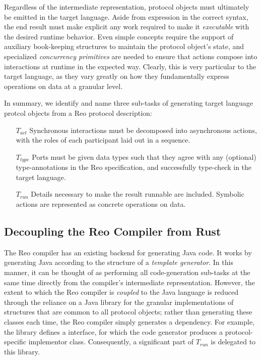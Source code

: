 Regardless of the intermediate representation, protocol objects must ultimately be emitted in the target language. Aside from expression in the correct syntax, the end result must make explicit any work required to make it \textit{executable} with the desired runtime behavior. Even simple concepts require the support of auxiliary book-keeping structures to maintain the protocol object's state, and specialized \textit{concurrency primitives} are needed to ensure that actions compose into interactions at runtime in the expected way. Clearly, this is very particular to the target language, as they vary greatly on how they fundamentally express operations on data at a granular level.

In summary, we identify and name three sub-tasks of generating target language protcol objects from a Reo protocol description:
\begin{itemize}
	\item [$T_{act}$] Synchronous interactions must be decomposed into asynchronous actions, with the roles of each participant laid out in a sequence.
	\item [$T_{type}$] Ports must be given data types such that they agree with any (optional) type-annotations in the Reo specification, and successfully type-check in the target language.
	\item [$T_{run}$] Details necessary to make the result runnable are included. Symbolic actions are represented as concrete operations on data.
\end{itemize}


\subsection{Decoupling the Reo Compiler from Rust}
\label{sec:decoupling_reo_rust}
The Reo compiler has an existing backend for generating Java code. It works by generating Java according to the structure of a \textit{template generator}. In this manner, it can be thought of as performing all code-generation sub-tasks at the same time directly from the compiler's intermediate representation. However, the extent to which the Reo compiler is \textit{coupled} to the Java language is reduced through the reliance on a Java library for the granular implementations of structures that are common to all protocol objects; rather than generating these classes each time, the Reo compiler simply generates a dependency. For example, the library defines a  interface, for which the code generator produces a protocol-specific implementor class. Consequently, a significant part of $T_{run}$ is delegated to this library.


